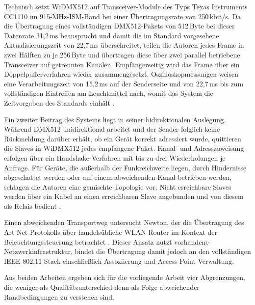 Technisch setzt WiDMX512 auf Transceiver-Module des Typs Texas Instruments
CC1110 im 915-MHz-ISM-Band bei einer Übertragungsrate von 250\,kbit/s. Da die
Übertragung eines vollständigen DMX512-Pakets von 512\,Byte bei dieser Datenrate
31{,}2\,ms beansprucht und damit die im Standard vorgesehene Aktualisierungszeit
von 22{,}7\,ms überschreitet, teilen die Autoren jedes Frame in zwei Hälften zu
je 256\,Byte und übertragen diese über zwei parallel betriebene Transceiver auf
getrennten Kanälen. Empfängerseitig wird das Frame über ein Doppelpufferverfahren
wieder zusammengesetzt. Oszilloskopmessungen weisen eine Verarbeitungszeit von
15{,}2\,ms auf der Senderseite und von 22{,}7\,ms bis zum vollständigen Eintreffen
am Leuchtmittel nach, womit das System die Zeitvorgaben des Standards einhält
\cite{yang2015real}.

Ein zweiter Beitrag des Systems liegt in seiner bidirektionalen Auslegung.
Während DMX512 unidirektional arbeitet und der Sender folglich keine Rückmeldung
darüber erhält, ob ein Gerät korrekt adressiert wurde, quittieren die Slaves in
WiDMX512 jedes empfangene Paket. Kanal- und Adresszuweisung erfolgen über ein
Handshake-Verfahren mit bis zu drei Wiederholungen je Anfrage. Für Geräte, die
außerhalb der Funkreichweite liegen, durch Hindernisse abgeschattet werden oder
auf einem abweichenden Kanal betrieben werden, schlagen die Autoren eine gemischte
Topologie vor: Nicht erreichbare Slaves werden über ein Kabel an einen erreichbaren
Slave angebunden und von diesem als Relais bedient \cite{yang2015real}.

Einen abweichenden Transportweg untersucht Newton, der die Übertragung des
Art-Net-Protokolls über handelsübliche WLAN-Router im Kontext der
Beleuchtungssteuerung betrachtet \cite{1554184}. Dieser Ansatz nutzt vorhandene
Netzwerkinfrastruktur, bindet die Übertragung damit jedoch an den vollständigen
IEEE-802.11-Stack einschließlich Assoziierung und Access-Point-Verwaltung.

Aus beiden Arbeiten ergeben sich für die vorliegende Arbeit vier Abgrenzungen,
die weniger als Qualitätsunterschied denn als Folge abweichender Randbedingungen
zu verstehen sind.

